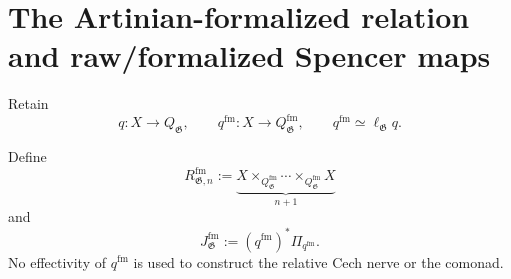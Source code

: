 \section{The Artinian-formalized relation and raw/formalized Spencer maps}
\label{sec:as-formalized-relation}

Retain
\[
    q:X\to Q_{\mathfrak G},
    \qquad
    q^{\mathrm{fm}}:X\to Q_{\mathfrak G}^{\mathrm{fm}},
    \qquad
    q^{\mathrm{fm}}\simeq\ell_{\mathfrak G}q.
\]

\begin{definition}
\label{def:as-formalized-relation}
Define
\[
\boxed{
    R_{\mathfrak G,n}^{\mathrm{fm}}
    :=
    \underbrace{
        X\times_{Q_{\mathfrak G}^{\mathrm{fm}}}
        \cdots
        \times_{Q_{\mathfrak G}^{\mathrm{fm}}}X
    }_{n+1}
}
\]
and
\[
\boxed{
    J_{\mathfrak G}^{\mathrm{fm}}
    :=
    (q^{\mathrm{fm}})^*\Pi_{q^{\mathrm{fm}}}.
}
\]
No effectivity of $q^{\mathrm{fm}}$ is used to construct the relative Cech
nerve or the comonad.
\end{definition}

